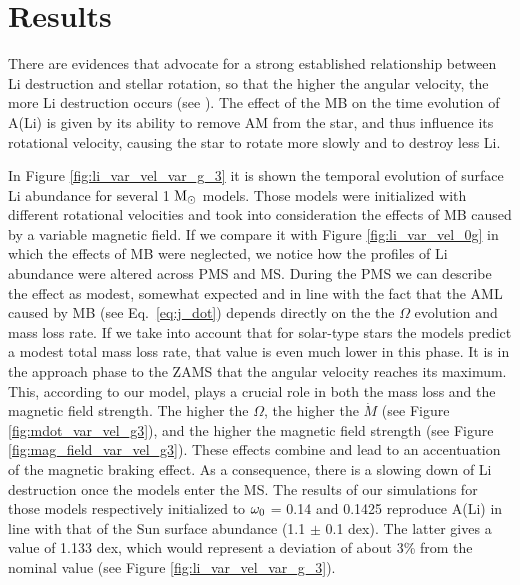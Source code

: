 \documentclass[fleqn,usenatbib]{mnras}
\begin{document}
\section{Results} \label{sec_3}
There are evidences that advocate for a strong established relationship between Li destruction and stellar rotation, so that the higher the angular velocity, the more Li destruction occurs (see \citet{Bouvier2018, Caballero2020}). The effect of the MB on the time evolution of A(Li) is given by its ability to remove AM from the star, and thus influence its rotational velocity, causing the star to rotate more slowly and to destroy less Li.\par

In Figure \ref{fig:li_var_vel_var_g_3} it is shown the temporal evolution of surface Li abundance for several 1 $\mathrm{M}_\odot$ models. Those models were initialized with different rotational velocities and took into consideration the effects of MB caused by a variable magnetic field. If we compare it with Figure \ref{fig:li_var_vel_0g} in which the effects of MB were neglected, we notice how the profiles of Li abundance were altered across PMS and MS. During the PMS we can describe the effect as modest, somewhat expected and in line with the fact that the AML caused by MB (see Eq.~\ref{eq:j_dot}) depends directly on the the $\Omega$ evolution and mass loss rate. If we take into account that for solar-type stars the models predict a modest total mass loss rate, that value is even much lower in this phase. It is in the approach phase to the ZAMS that the angular velocity reaches its maximum. This, according to our model, plays a crucial role in both the mass loss and the magnetic field strength. The higher the $\Omega$, the higher the $\Dot{M}$  (see Figure \ref{fig:mdot_var_vel_g3}), and the higher the magnetic field strength (see Figure \ref{fig:mag_field_var_vel_g3}). These effects combine and lead to an accentuation of the magnetic braking effect. As a consequence, there is a slowing down of Li destruction once the models enter the MS. The results of our simulations for those models respectively initialized to $\omega_{\mathrm{0}}$ = 0.14 and 0.1425 reproduce A(Li) in line with that of the Sun surface  abundance  (1.1 $\pm$ 0.1 dex). The latter gives a value of 1.133 dex, which would represent a deviation of about 3\% from the nominal value (see Figure \ref{fig:li_var_vel_var_g_3}).\par
\end{document}
